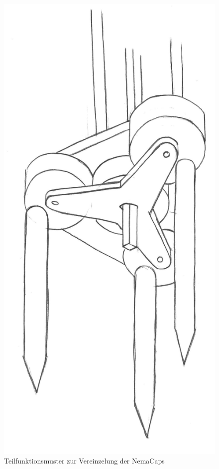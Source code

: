 \begin{figure}[H]
	\includegraphics[scale=0.5]{Illustrationen/5-Konzept/blau_Verstellmechanismus.jpg}
	\caption{Teilfunktionsmuster zur Vereinzelung der NemaCaps}
	\label{fig:blau_verstellmech}
\end{figure}